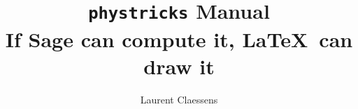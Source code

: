 \documentclass[a4paper]{article}
\begin{document}
\title{\texttt{phystricks} Manual\\If Sage can compute it, \LaTeX\ can draw it}
\author{Laurent Claessens}
\maketitle

\tableofcontents



\end{document}
